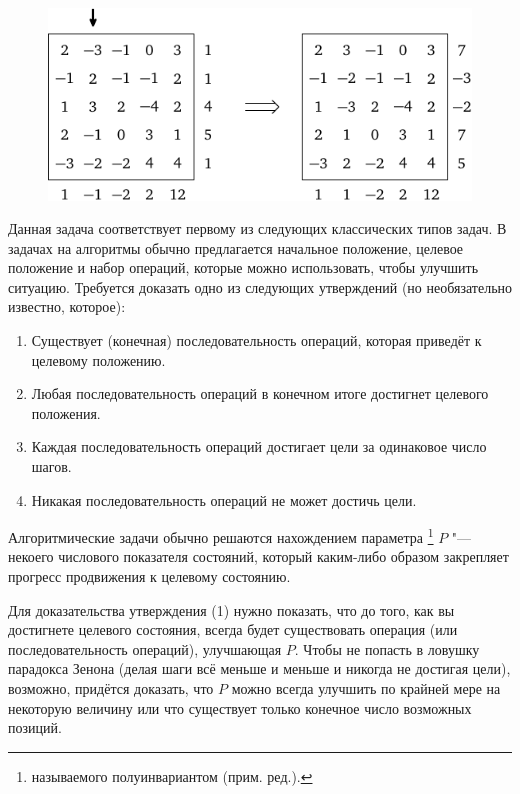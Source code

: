 \documentclass[twoside]{book}
\begin{document}
\begin{figure}
\centering
\includegraphics{mp/wink-16}
\end{figure}


Данная задача соответствует первому из следующих классических типов задач.
В задачах на алгоритмы обычно предлагается начальное положение, целевое положение и набор операций, которые можно использовать, чтобы улучшить ситуацию.
Требуется доказать одно из следующих утверждений (но необязательно известно, которое):
\begin{enumerate}[label=(\arabic*),noitemsep,leftmargin=\parindent,labelsep=3.5pt]
\item Существует (конечная) последовательность операций, которая приведёт к целевому положению.
\item Любая последовательность операций в конечном итоге достигнет целевого положения.
\item Каждая последовательность операций достигает цели за одинаковое число шагов.
\item Никакая последовательность операций не может достичь цели.
\end{enumerate}

Алгоритмические задачи обычно решаются нахождением параметра%
\footnote{называемого полуинвариантом (прим. ред.).}
$P$ "--- некоего числового показателя состояний, который каким-либо образом закрепляет прогресс продвижения к целевому состоянию.

Для доказательства утверждения (1) нужно показать, что до того, как вы достигнете целевого состояния, всегда будет существовать операция (или последовательность операций), улучшающая $P$.
Чтобы не попасть в ловушку парадокса Зенона (делая шаги всё меньше и меньше и никогда не достигая цели), возможно, придётся доказать, что $P$ можно всегда улучшить по крайней мере на некоторую величину или что существует только конечное число возможных позиций.
\end{document}
